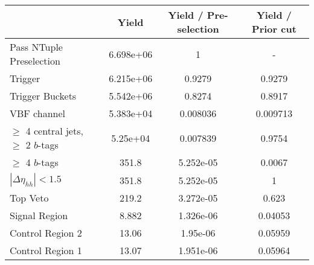 \begin{table}
{\begin{tabular}{lccc}
\toprule
{} &     Yield &  Yield / Pre-selection &  Yield / Prior cut \\
\midrule
Pass NTuple Preselection               & 6.698e+06 &                      1 &                  - \\
Trigger                                & 6.215e+06 &                 0.9279 &             0.9279 \\
Trigger Buckets                        & 5.542e+06 &                 0.8274 &             0.8917 \\
VBF channel                            & 5.383e+04 &               0.008036 &           0.009713 \\
$\ge$ 4 central jets, $\ge$ 2 $b$-tags &  5.25e+04 &               0.007839 &             0.9754 \\
$\ge$ 4 $b$-tags                       &     351.8 &              5.252e-05 &             0.0067 \\
$|\Delta\eta_{hh}| < 1.5$              &     351.8 &              5.252e-05 &                  1 \\
Top Veto                               &     219.2 &              3.272e-05 &              0.623 \\
Signal Region                          &     8.882 &              1.326e-06 &            0.04053 \\
Control Region 2                       &     13.06 &               1.95e-06 &            0.05959 \\
Control Region 1                       &     13.07 &              1.951e-06 &            0.05964 \\
\bottomrule
\end{tabular}
} \ 
\end{table}
